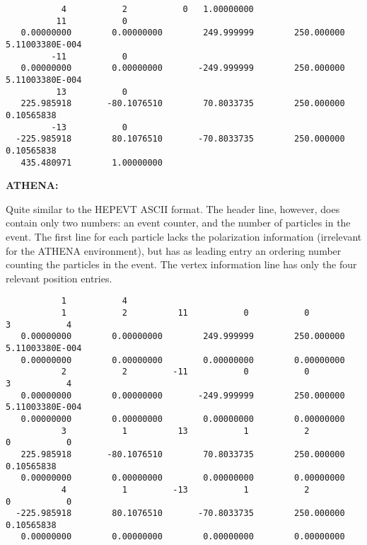 \documentclass[12pt]{book}
\begin{document}
\begin{scriptsize}
  \begin{verbatim}
           4           2           0   1.00000000
          11           0
   0.00000000        0.00000000        249.999999        250.000000       5.11003380E-004
         -11           0
   0.00000000        0.00000000       -249.999999        250.000000       5.11003380E-004
          13           0
   225.985918       -80.1076510        70.8033735        250.000000       0.10565838
         -13           0
  -225.985918        80.1076510       -70.8033735        250.000000       0.10565838
   435.480971        1.00000000
  \end{verbatim}
\end{scriptsize}

{\bf ATHENA:}

Quite similar to the HEPEVT ASCII format. The header line, however,
does contain only two numbers: an event counter, and the number of
particles in the event. The first line for each particle lacks the
polarization information (irrelevant for the ATHENA environment), but
has as leading entry an ordering number counting the particles in the
event. The vertex information line has only the four relevant position
entries. 


\begin{scriptsize}
  \begin{verbatim}
           1           4          
           1           2          11           0           0           3           4          
   0.00000000        0.00000000        249.999999        250.000000       5.11003380E-004
   0.00000000        0.00000000        0.00000000        0.00000000      
           2           2         -11           0           0           3           4          
   0.00000000        0.00000000       -249.999999        250.000000       5.11003380E-004
   0.00000000        0.00000000        0.00000000        0.00000000      
           3           1          13           1           2           0           0          
   225.985918       -80.1076510        70.8033735        250.000000       0.10565838
   0.00000000        0.00000000        0.00000000        0.00000000      
           4           1         -13           1           2           0           0          
  -225.985918        80.1076510       -70.8033735        250.000000       0.10565838
   0.00000000        0.00000000        0.00000000        0.00000000      
  \end{verbatim}
\end{scriptsize}
\end{document}
